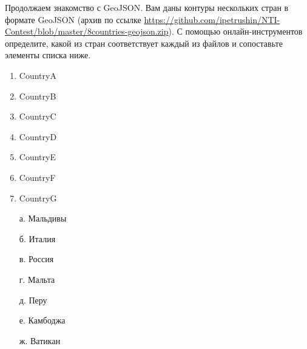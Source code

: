 
Продолжаем знакомство с GeoJSON. Вам даны контуры нескольких стран в формате GeoJSON (архив по ссылке \url{https://github.com/ipetrushin/NTI-Contest/blob/master/8countries-geojson.zip}). 
С помощью онлайн-инструментов определите, какой из стран соответствует каждый из файлов и сопоставьте элементы списка ниже.

\begin{multicols}{2}
    {
        \begin{enumerate}
            \item CountryA
            \item CountryB
            \item CountryC
            \item CountryD
            \item CountryE
            \item CountryF
            \item CountryG
        \end{enumerate}
    }

    {
        \begin{enumerate}
            \item[а.] Мальдивы
            \item[б.] Италия
            \item[в.] Россия
            \item[г.] Мальта
            \item[д.] Перу
            \item[е.] Камбоджа
            \item[ж.]Ватикан
        \end{enumerate}
    }
    
\end{multicols}